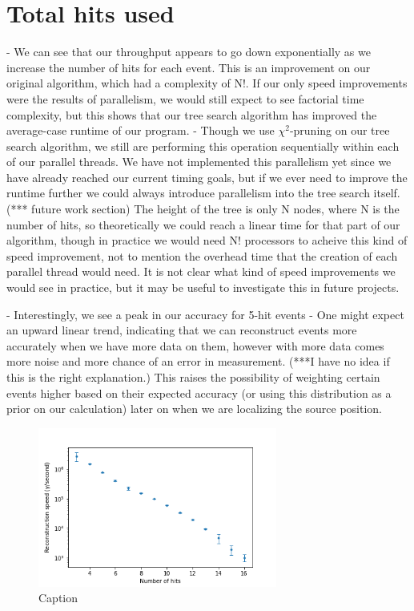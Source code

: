 
\section{Total hits used}
- We can see that our throughput appears to go down exponentially as we increase the number of hits for each event. This is an improvement on our original algorithm, which had a complexity of N!. If our only speed improvements were the results of parallelism, we would still expect to see factorial time complexity, but this shows that our tree search algorithm has improved the average-case runtime of our program.
- Though we use $\chi^2$-pruning on our tree search algorithm, we still are performing this operation sequentially within each of our parallel threads. We have not implemented this parallelism yet since we have already reached our current timing goals, but if we ever need to improve the runtime further we could always introduce parallelism into the tree search itself. (*** future work section) The height of the tree is only N nodes, where N is the number of hits, so theoretically we could reach a linear time for that part of our algorithm, though in practice we would need N! processors to acheive this kind of speed improvement, not to mention the overhead time that the creation of each parallel thread would need. It is not clear what kind of speed improvements we would see in practice, but it may be useful to investigate this in future projects.

- Interestingly, we see a peak in our accuracy for 5-hit events
- One might expect an upward linear trend, indicating that we can reconstruct events more accurately when we have more data on them, however with more data comes more noise and more chance of an error in measurement. (***I have no idea if this is the right explanation.) This raises the possibility of weighting certain events higher based on their expected accuracy (or using this distribution as a prior on our calculation) later on when we are localizing the source position.

\begin{figure}
    \centering
    \includegraphics[width=0.7\textwidth]{graphs/pi_hits_speed.png}
    \caption{Caption}
    \label{fig:my_label}
\end{figure}

